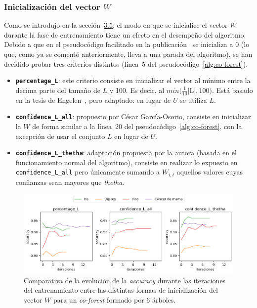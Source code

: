 \subsubsection{Inicialización del vector $W$}
\label{s-experimentacion-w-cof}

Como se introdujo en la sección~\hyperref[s:discusion-paramentros-cof]{3.5}, el modo en que se inicialice el vector $W$ durante la fase de entrenamiento tiene un efecto en el desempeño del algoritmo. Debido a que en el pseudocódigo facilitado en la publicación~\cite{originalCoForest2007} se inicializa a 0 (lo que, como ya se comentó anteriormente, lleva a una parada del algoritmo), se han decidido probar tres criterios distintos (línea~5 del pseudocódigo~\ref{alg:co-forest}).

\begin{itemize}
	\item \textbf{\texttt{percentage\_L}}: este criterio consiste en inicializar el vector al mínimo entre la decima parte del tamaño de $L$ y 100. Es decir, al $min(\frac{1}{10}|$L$|, 100)$. Está basado en la tesis de Engelen~\cite{engelen2018thesis}, pero adaptado: en lugar de $U$ se utiliza $L$.
	\item \textbf{\texttt{confidence\_L\_all}}: propuesto por César García-Osorio, consiste en inicializar la $W$ de forma similar a la línea~20 del pseudocódigo~\ref{alg:co-forest}, con la excepción de usar el conjunto $L$ en lugar de $U$.
	\item \textbf{\texttt{confidence\_L\_thetha}}: adaptación propuesta por la autora (basada en el funcionamiento normal del algoritmo), consiste en realizar lo expuesto en \texttt{confidence\_L\_all} pero únicamente sumando a $W_{i,t}$ aquellos valores cuyas confianzas sean mayores que \textit{thetha}.
\end{itemize}

\begin{figure}[h]
	\caption[\textit{Co-Forest}: resultados (inicialización $W$ con 6 árboles)]{Comparativa de la evolución de la \textit{accuracy} durante las iteraciones del entrenamiento entre las distintas formas de inicialización del vector $W$ para un \textit{co-forest} formado por 6 árboles.}
	\label{img:w_init-6-trees}
	\centering
	\includegraphics[width=\textwidth]{../img/memoria/5_coforest_w-init_rd5_n6}
\end{figure}

